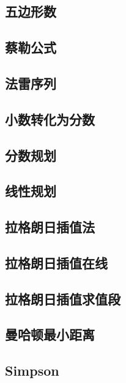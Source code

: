 \documentclass{article}
\begin{document}
\subsection{五边形数} 

\subsection{蔡勒公式} 


\subsection{法雷序列} 

\subsection{小数转化为分数} 

\subsection{分数规划} 

\subsection{线性规划} 


\subsection{拉格朗日插值法} 

\subsection{拉格朗日插值在线} 

\subsection{拉格朗日插值求值段} 

\subsection{曼哈顿最小距离} 


\subsection{Simpson} 

\end{document}
